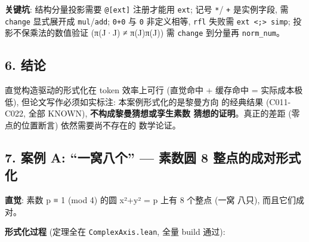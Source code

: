 \documentclass[
]{article}
\begin{document}
\textbf{关键坑}: 结构分量投影需要 \texttt{@{[}ext{]}} 注册才能用
\texttt{ext}; 记号 \texttt{*}/ \texttt{+} 是实例字段, 需 \texttt{change}
显式展开成 \texttt{mul}/\texttt{add}; \texttt{0+0} 与 \texttt{0}
非定义相等, \texttt{rfl} 失败需
\texttt{ext\ \textless{};\textgreater{}\ simp}; 投影不保乘法的数值验证
(π(J·J) ≠ π(J)π(J)) 需 \texttt{change} 到分量再 \texttt{norm\_num}。

\subsection{6. 结论}\label{ux7ed3ux8bba}

直觉构造驱动的形式化在 token 效率上可行 (直觉命中 + 缓存命中 =
实际成本极低), 但论文写作必须如实标注: 本案例形式化的是黎曼方向
的经典结果 (C011-C022, 全部 KNOWN), \textbf{不构成黎曼猜想或孪生素数
猜想的证明}。真正的差距 (零点的位置断言) 依然需要尚不存在的 数学论证。

\subsection{7. 案例 A: ``一窝八个'' --- 素数圆 8
整点的成对形式化}\label{ux6848ux4f8b-a-ux4e00ux7a9dux516bux4e2a-ux7d20ux6570ux5706-8-ux6574ux70b9ux7684ux6210ux5bf9ux5f62ux5f0fux5316}

\textbf{直觉}: 素数 p ≡ 1 (mod 4) 的圆 x²+y² = p 上有 8 个整点 (一窝
八只), 而且它们成对。

\textbf{形式化过程} (定理全在 \texttt{ComplexAxis.lean}, 全量 build
通过):
\end{document}
